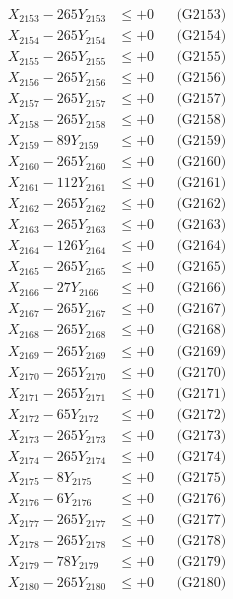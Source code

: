 \documentclass[a4paper,10pt]{article}
\begin{document}
{\begin{align}
X_{2153} - 265Y_{2153} &\leq +0 && \text{(G2153)} \\
X_{2154} - 265Y_{2154} &\leq +0 && \text{(G2154)} \\
X_{2155} - 265Y_{2155} &\leq +0 && \text{(G2155)} \\
X_{2156} - 265Y_{2156} &\leq +0 && \text{(G2156)} \\
X_{2157} - 265Y_{2157} &\leq +0 && \text{(G2157)} \\
X_{2158} - 265Y_{2158} &\leq +0 && \text{(G2158)} \\
X_{2159} - 89Y_{2159} &\leq +0 && \text{(G2159)} \\
X_{2160} - 265Y_{2160} &\leq +0 && \text{(G2160)} \\
\allowbreak
X_{2161} - 112Y_{2161} &\leq +0 && \text{(G2161)} \\
X_{2162} - 265Y_{2162} &\leq +0 && \text{(G2162)} \\
X_{2163} - 265Y_{2163} &\leq +0 && \text{(G2163)} \\
X_{2164} - 126Y_{2164} &\leq +0 && \text{(G2164)} \\
X_{2165} - 265Y_{2165} &\leq +0 && \text{(G2165)} \\
X_{2166} - 27Y_{2166} &\leq +0 && \text{(G2166)} \\
X_{2167} - 265Y_{2167} &\leq +0 && \text{(G2167)} \\
X_{2168} - 265Y_{2168} &\leq +0 && \text{(G2168)} \\
X_{2169} - 265Y_{2169} &\leq +0 && \text{(G2169)} \\
X_{2170} - 265Y_{2170} &\leq +0 && \text{(G2170)} \\
\allowbreak
X_{2171} - 265Y_{2171} &\leq +0 && \text{(G2171)} \\
X_{2172} - 65Y_{2172} &\leq +0 && \text{(G2172)} \\
X_{2173} - 265Y_{2173} &\leq +0 && \text{(G2173)} \\
X_{2174} - 265Y_{2174} &\leq +0 && \text{(G2174)} \\
X_{2175} - 8Y_{2175} &\leq +0 && \text{(G2175)} \\
X_{2176} - 6Y_{2176} &\leq +0 && \text{(G2176)} \\
X_{2177} - 265Y_{2177} &\leq +0 && \text{(G2177)} \\
X_{2178} - 265Y_{2178} &\leq +0 && \text{(G2178)} \\
X_{2179} - 78Y_{2179} &\leq +0 && \text{(G2179)} \\
X_{2180} - 265Y_{2180} &\leq +0 && \text{(G2180)} \\

\end{align}}
\end{document}
